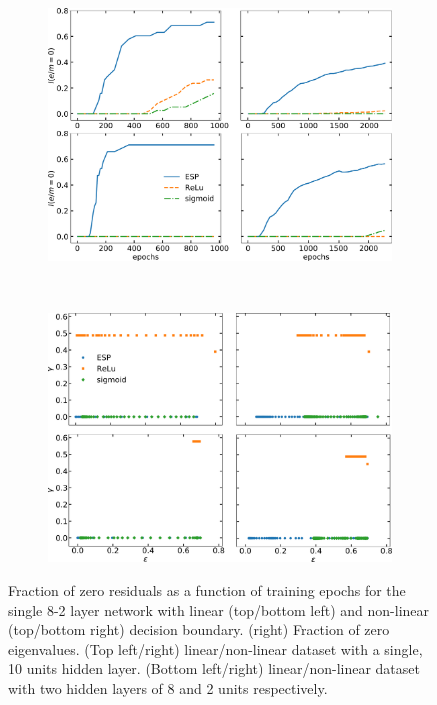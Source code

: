 \documentclass[5p]{elsarticle}
\begin{document}
\begin{figure}[t!]
 \centering
 	\begin{subfigure}[b]{0.48\textwidth}
 	\includegraphics[width=\textwidth]{residues.pdf}
	\label{fig:res}
	\end{subfigure}
	~
	\begin{subfigure}[b]{0.48\textwidth}
 	\includegraphics[width=\textwidth]{gamma.pdf}
	\label{fig:gamma}
	\end{subfigure}
\caption{ \label{fig:res}  Fraction of zero residuals as a function of training epochs for the single 8-2 layer network with linear (top/bottom left) and non-linear (top/bottom right) decision boundary. (right) Fraction of zero eigenvalues. (Top left/right) linear/non-linear dataset with a single, 10 units hidden layer. (Bottom left/right)  linear/non-linear dataset with two hidden layers of 8 and 2 units respectively. }
\end{figure}
%
\end{document}
